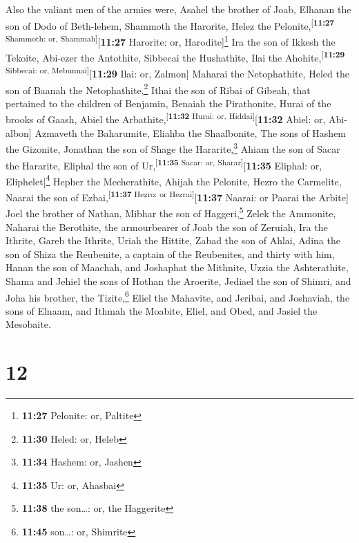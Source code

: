  Also the valiant men of the armies were, Asahel the
brother of Joab, Elhanan the son of Dodo of Beth-lehem, 
Shammoth the Harorite, Helez the
Pelonite,\textsuperscript{{[}\textbf{11:27} Shammoth: or,
Shammah{]}}{[}\textbf{11:27} Harorite: or, Harodite{]}\footnote{\textbf{11:27}
  Pelonite: or, Paltite}  Ira the son of Ikkesh the
Tekoite, Abi-ezer the Antothite,  Sibbecai the
Hushathite, Ilai the Ahohite,\textsuperscript{{[}\textbf{11:29}
Sibbecai: or, Mebunnai{]}}{[}\textbf{11:29} Ilai: or, Zalmon{]}
 Maharai the Netophathite, Heled the son of Baanah the
Netophathite,\footnote{\textbf{11:30} Heled: or, Heleb} 
Ithai the son of Ribai of Gibeah, that pertained to the children of
Benjamin, Benaiah the Pirathonite,  Hurai of the brooks
of Gaash, Abiel the Arbathite,\textsuperscript{{[}\textbf{11:32} Hurai:
or, Hiddai{]}}{[}\textbf{11:32} Abiel: or, Abi-albon{]} 
Azmaveth the Baharumite, Eliahba the Shaalbonite,  The
sons of Hashem the Gizonite, Jonathan the son of Shage the
Hararite,\footnote{\textbf{11:34} Hashem: or, Jashen} 
Ahiam the son of Sacar the Hararite, Eliphal the son of
Ur,\textsuperscript{{[}\textbf{11:35} Sacar: or,
Sharar{]}}{[}\textbf{11:35} Eliphal: or, Eliphelet{]}\footnote{\textbf{11:35}
  Ur: or, Ahasbai}  Hepher the Mecherathite, Ahijah the
Pelonite,  Hezro the Carmelite, Naarai the son of
Ezbai,\textsuperscript{{[}\textbf{11:37} Hezro: or
Hezrai{]}}{[}\textbf{11:37} Naarai: or Paarai the Arbite{]}
 Joel the brother of Nathan, Mibhar the son of
Haggeri,\footnote{\textbf{11:38} the son\ldots: or, the Haggerite}
 Zelek the Ammonite, Naharai the Berothite, the
armourbearer of Joab the son of Zeruiah,  Ira the
Ithrite, Gareb the Ithrite,  Uriah the Hittite, Zabad the
son of Ahlai,  Adina the son of Shiza the Reubenite, a
captain of the Reubenites, and thirty with him,  Hanan
the son of Maachah, and Joshaphat the Mithnite,  Uzzia
the Ashterathite, Shama and Jehiel the sons of Hothan the Aroerite,
 Jediael the son of Shimri, and Joha his brother, the
Tizite,\footnote{\textbf{11:45} son\ldots: or, Shimrite} 
Eliel the Mahavite, and Jeribai, and Joshaviah, the sons of Elnaam, and
Ithmah the Moabite,  Eliel, and Obed, and Jasiel the
Mesobaite.

\hypertarget{section-11}{%
\section{12}\label{section-11}}

